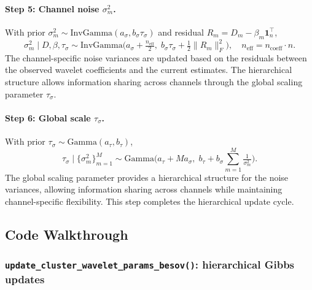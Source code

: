 \documentclass[11pt]{article}
\begin{document}
\paragraph{Step 5: Channel noise $\sigma_m^2$.}
With prior $\sigma_m^2 \sim \mathrm{InvGamma}(a_\sigma,b_\sigma\tau_\sigma)$ and residual $R_m = D_m - \beta_m \mathbf{1}_n^\top$,
\[
\sigma_m^2 \mid D,\beta,\tau_\sigma \sim
\mathrm{InvGamma}\!\Big(a_\sigma+\tfrac{n_\text{eff}}{2},\;
b_\sigma\tau_\sigma + \tfrac{1}{2}\|R_m\|_F^2\Big),
\quad n_\text{eff}=n_{\text{coeff}}\cdot n .
\]
The channel-specific noise variances are updated based on the residuals between the observed wavelet coefficients and the current estimates. The hierarchical structure allows information sharing across channels through the global scaling parameter $\tau_\sigma$.

\paragraph{Step 6: Global scale $\tau_\sigma$.}
With prior $\tau_\sigma\sim \mathrm{Gamma}(a_\tau,b_\tau)$,
\[
\tau_\sigma \mid \{\sigma_m^2\}_{m=1}^M \sim
\mathrm{Gamma}\!\Big(a_\tau + M a_\sigma,\;
b_\tau + b_\sigma \sum_{m=1}^M \tfrac{1}{\sigma_m^2}\Big).
\]
The global scaling parameter provides a hierarchical structure for the noise variances, allowing information sharing across channels while maintaining channel-specific flexibility. This step completes the hierarchical update cycle.

\subsection{Code Walkthrough}

\subsubsection{\texttt{update\_cluster\_wavelet\_params\_besov()}: hierarchical Gibbs updates}
\end{document}
